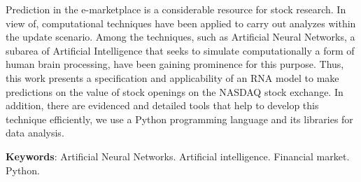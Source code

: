 \begin{resumo}[ABSTRACT]	
Prediction in the e-marketplace is a considerable resource for stock research. In view of, computational techniques have been applied to carry out analyzes within the update scenario. Among the techniques, such as Artificial Neural Networks, a subarea of Artificial Intelligence that seeks to simulate computationally a form of human brain processing, have been gaining prominence for this purpose. Thus, this work presents a specification and applicability of an RNA model to make predictions on the value of stock openings on the NASDAQ stock exchange. In addition, there are evidenced and detailed tools that help to develop this technique efficiently, we use a Python programming language and its libraries for data analysis.

\vspace{\onelineskip}
    
\noindent
\textbf{Keywords}: Artificial Neural Networks. Artificial intelligence. Financial market. Python.
\end{resumo}
